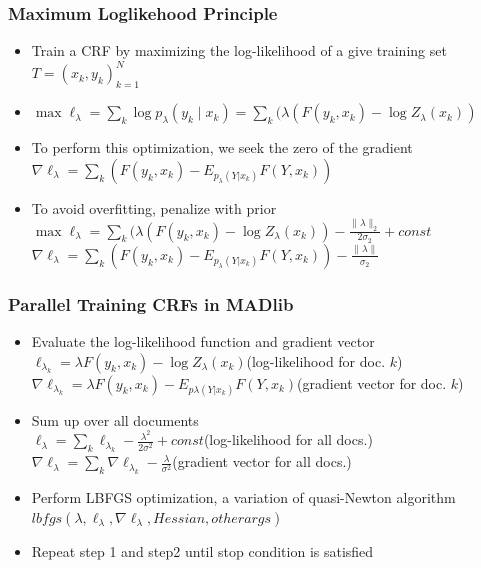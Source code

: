 \documentclass{beamer}
\begin{document}
\begin{frame}
  \frametitle{Maximum Log\-likehood Principle}
  \begin{itemize}

 \item  Train a CRF by maximizing the log-likelihood of a give training set $T={(x_k,y_k)}_{k=1}^N$\\
 \item $\max \ell_{\lambda}=\sum_k{\log p_\lambda(y_k\mid x_k)}=\sum_k{(\lambda (F(y_k,x_k)-\log Z_\lambda(x_k))}$\\
 \item To perform this optimization, we seek the zero of the gradient\\
  $\nabla \ell_{\lambda}=\sum_k{(F(y_k,x_k)-E_{p_\lambda(Y|x_k)}F(Y,x_k))}$\\
 \item To avoid overfitting, penalize with prior\\
      $\max \ell_{\lambda}=\sum_k{(\lambda (F(y_k,x_k)-\log Z_\lambda(x_k))}-
\frac{\lVert \lambda \rVert_2}{2\sigma_2}
      +const$\\
  $\nabla \ell_{\lambda}=\sum_k{(F(y_k,x_k)-E_{p_\lambda(Y|x_k)}F(Y,x_k))}-\frac{\lVert \lambda \rVert}{\sigma_2}$\\
  \end{itemize}
\end{frame}

\begin{frame}
  \frametitle{Parallel Training CRFs in MADlib}
\begin{itemize}
\item Evaluate the log-likelihood function and gradient vector\\
$\ell_{\lambda_k}=\lambda F(y_k,x_k)-\log Z_\lambda(x_k)$(log-likelihood for doc. $k$)\\
$\nabla \ell_{\lambda_k}=\lambda F(y_k,x_k)-E_{p\lambda(Y|x_k)}F(Y,x_k)$(gradient vector for doc. $k$)\\
\item Sum up over all documents \\
$\ell_\lambda=\sum_k\ell_{\lambda_k}-\frac{\lambda^2}{2\sigma ^2}+const$(log-likelihood for all docs.)\\
$\nabla \ell_\lambda=\sum_k\nabla \ell_{\lambda_k}-\frac{\lambda}{\sigma ^2}$(gradient vector for all docs.)\\
\item Perform LBFGS optimization, a variation of quasi-Newton algorithm\\
$lbfgs(\lambda,\ell_\lambda,\nabla \ell_\lambda,Hessian,other args)$\\
\item Repeat step 1 and step2 until stop condition is satisfied
\end{itemize}
\end{frame}
\end{document}
